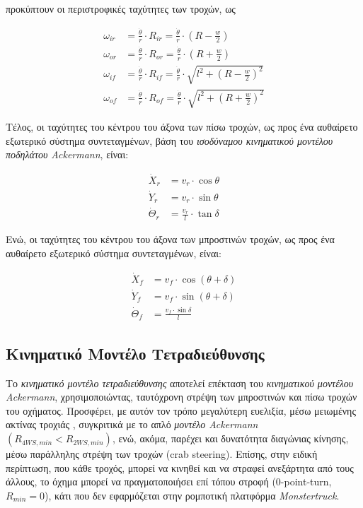 \noindent
προκύπτουν οι περιστροφικές ταχύτητες των τροχών, ως

\begin{align}
	\omega_{ir} &= \frac{\dot\theta}{r} \cdot R_{ir} = \frac{\dot\theta}{r} \cdot (R - \frac{w}{2})
	\label{eq:ack_wir}\\
	\omega_{or} &= \frac{\dot\theta}{r} \cdot R_{or} = \frac{\dot\theta}{r} \cdot (R + \frac{w}{2})
	\label{eq:ack_wor}\\
	\omega_{if} &= \frac{\dot\theta}{r} \cdot R_{if} = \frac{\dot\theta}{r} \cdot \sqrt{l^2 + (R - \frac{w}{2})^2}
	\label{eq:ack_wif}\\
	\omega_{of} &= \frac{\dot\theta}{r} \cdot R_{of} = \frac{\dot\theta}{r} \cdot \sqrt{l^2 + (R + \frac{w}{2})^2}
	\label{eq:ack_wof}
\end{align}

\bigskip
Τέλος, οι ταχύτητες του κέντρου του άξονα των πίσω τροχών, ως προς ένα αυθαίρετο εξωτερικό σύστημα συντεταγμένων, βάση του \textit{ισοδύναμου κινηματικού μοντέλου ποδηλάτου Ackermann}, είναι:

\begin{align}
	\dot X_r &= v_r \cdot \cos\theta\\
	\dot Y_r &= v_r \cdot \sin\theta\\
	\dot \Theta_r &= \frac{v_r}{l} \cdot \tan\delta
\end{align}

Ενώ, οι ταχύτητες του κέντρου του άξονα των μπροστινών τροχών, ως προς ένα αυθαίρετο εξωτερικό σύστημα συντεταγμένων, είναι:

\begin{align}
	\dot X_f &= v_f \cdot \cos(\theta+\delta)\\
	\dot Y_f &= v_f \cdot \sin(\theta+\delta)\\
	\dot \Theta_f &= \frac{v_f \cdot \sin\delta}{l}
\end{align}


\bigskip
\subsection{Κινηματικό Μοντέλο Τετραδιεύθυνσης} \label{ssec:4ws_kinematics}
Το \textit{κινηματικό μοντέλο τετραδιεύθυνσης} αποτελεί επέκταση του \textit{κινηματικού μοντέλου Ackermann}, χρησιμοποιώντας, ταυτόχρονη στρέψη των μπροστινών και πίσω τροχών του οχήματος. Προσφέρει, με αυτόν τον τρόπο μεγαλύτερη ευελιξία, μέσω μειωμένης ακτίνας τροχιάς , συγκριτικά με το απλό \textit{μοντέλο Ackermann} $(R_{4WS, min} < R_{2WS, min})$, ενώ, ακόμα, παρέχει και δυνατότητα  διαγώνιας κίνησης, μέσω παράλληλης στρέψη των τροχών (crab steering). Επίσης, στην ειδική περίπτωση, που κάθε τροχός, μπορεί να κινηθεί και να στραφεί ανεξάρτητα από τους άλλους, το όχημα μπορεί να πραγματοποιήσει επί τόπου στροφή (0-point-turn, $R_{min}=0$), κάτι που δεν εφαρμόζεται στην ρομποτική πλατφόρμα \textit{Monstertruck}.

